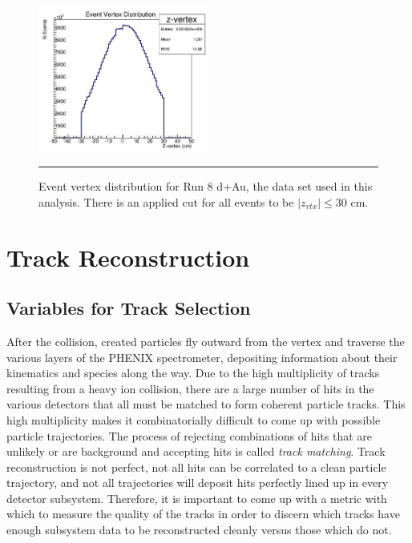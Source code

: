 \begin{figure}[htbp!]
  \centering
    \includegraphics[width=0.5\textwidth]{evtQA/zvtxdist.JPG}
    \rule{35em}{0.5pt}
  \caption[Event Vertex Distribution]{Event vertex distribution for Run 8 d+Au, the data set used in this analysis. There is an applied cut for all events to be $|z_{vtx}| \leq 30$ cm.}
  \label{fig:vtxdist}
\end{figure}

\section{Track Reconstruction}
\label{trkrecosect}
\subsection{Variables for Track Selection}
After the collision, created particles fly outward from the vertex and traverse the various layers of the PHENIX spectrometer, depositing information about their kinematics and species along the way. Due to the high multiplicity of tracks resulting from a heavy ion collision, there are a large number of hits in the various detectors that all must be matched to form coherent particle tracks. This high multiplicity makes it combinatorially difficult to come up with possible particle trajectories. The process of rejecting combinations of hits that are unlikely or are background and accepting hits is called \textit{track matching}. Track reconstruction is not perfect, not all hits can be correlated to a clean particle trajectory, and not all trajectories will deposit hits perfectly lined up in every detector subsystem. Therefore, it is important to come up with a metric with which to measure the quality of the tracks in order to discern which tracks have enough subsystem data to be reconstructed cleanly versus those which do not.
